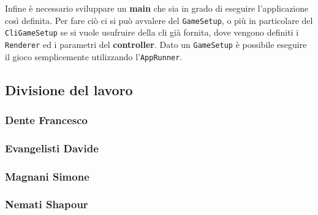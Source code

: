 Infine è necessario sviluppare un \textbf{main} che sia in grado di eseguire l'applicazione così definita.
%
Per fare ciò ci si può avvalere del \texttt{GameSetup}, o più in particolare del \texttt{CliGameSetup} se si vuole usufruire della cli già fornita, dove vengono definiti i \texttt{Renderer} ed i parametri del \textbf{controller}.
%
Dato un \texttt{GameSetup} è possibile eseguire il gioco semplicemente utilizzando l'\texttt{AppRunner}.

\subsection{Divisione del lavoro}

\subsubsection{Dente Francesco}

\subsubsection{Evangelisti Davide}

\subsubsection{Magnani Simone}

\subsubsection{Nemati Shapour}


